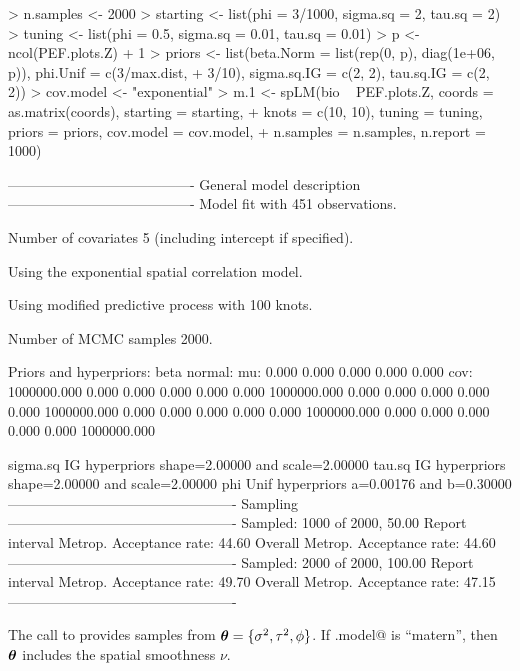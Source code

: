 \documentclass{article}
\newcommand{\btheta}{ \mbox{\boldmath $ \theta $} }
\begin{document}
\begin{Schunk}
\begin{Sinput}
> n.samples <- 2000
> starting <- list(phi = 3/1000, sigma.sq = 2, tau.sq = 2)
> tuning <- list(phi = 0.5, sigma.sq = 0.01, tau.sq = 0.01)
> p <- ncol(PEF.plots.Z) + 1
> priors <- list(beta.Norm = list(rep(0, p), diag(1e+06, p)), phi.Unif = c(3/max.dist, 
+     3/10), sigma.sq.IG = c(2, 2), tau.sq.IG = c(2, 2))
> cov.model <- "exponential"
> m.1 <- spLM(bio ~ PEF.plots.Z, coords = as.matrix(coords), starting = starting, 
+     knots = c(10, 10), tuning = tuning, priors = priors, cov.model = cov.model, 
+     n.samples = n.samples, n.report = 1000)
\end{Sinput}
\begin{Soutput}
----------------------------------------
	General model description
----------------------------------------
Model fit with 451 observations.

Number of covariates 5 (including intercept if specified).

Using the exponential spatial correlation model.

Using modified predictive process with 100 knots.

Number of MCMC samples 2000.

Priors and hyperpriors:
	beta normal:
	mu:	0.000	0.000	0.000	0.000	0.000	
	cov:
	1000000.000	0.000	0.000	0.000	0.000	
	0.000	1000000.000	0.000	0.000	0.000	
	0.000	0.000	1000000.000	0.000	0.000	
	0.000	0.000	0.000	1000000.000	0.000	
	0.000	0.000	0.000	0.000	1000000.000	

	sigma.sq IG hyperpriors shape=2.00000 and scale=2.00000
	tau.sq IG hyperpriors shape=2.00000 and scale=2.00000
	phi Unif hyperpriors a=0.00176 and b=0.30000
-------------------------------------------------
		Sampling
-------------------------------------------------
Sampled: 1000 of 2000, 50.00%
Report interval Metrop. Acceptance rate: 44.60%
Overall Metrop. Acceptance rate: 44.60%
-------------------------------------------------
Sampled: 2000 of 2000, 100.00%
Report interval Metrop. Acceptance rate: 49.70%
Overall Metrop. Acceptance rate: 47.15%
-------------------------------------------------
\end{Soutput}
\end{Schunk}

The call to \verb@spLM@ provides samples from $\btheta = \{\sigma^2, \tau^2, \phi\}$. If \verb@cov.model@ is ``matern'', then $\btheta$ includes the spatial smoothness $\nu$. 
\end{document}
